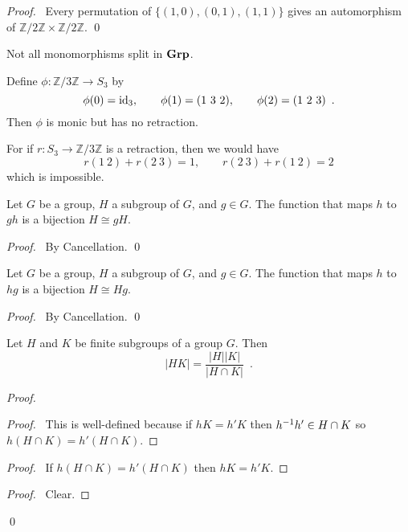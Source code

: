\begin{proof}
    \pf\ Every permutation of $\{ (1,0), (0,1), (1,1) \}$ gives an automorphism of $\mathbb{Z} / 2 \mathbb{Z} \times \mathbb{Z} / 2 \mathbb{Z}$. \qed
\end{proof}

\begin{ex}
Not all monomorphisms split in $\mathbf{Grp}$.

Define $\phi : \mathbb{Z} / 3 \mathbb{Z} \rightarrow S_3$ by
\[ \phi(0) = \id{3}, \qquad \phi(1) = (1 \ 3 \ 2), \qquad \phi(2) = (1 \ 2 \ 3) \enspace . \]
Then $\phi$ is monic but has no retraction.

For if $r : S_3 \rightarrow \mathbb{Z} / 3 \mathbb{Z}$ is a retraction, then we would have
\[ r(1\ 2) + r(2\ 3) = 1, \qquad r(2\ 3) + r(1\ 2) = 2 \]
which is impossible.
\end{ex}

\begin{prop}
Let $G$ be a group, $H$ a subgroup of $G$, and $g \in G$. The function that maps $h$ to $gh$ is a bijection $H \cong gH$.
\end{prop}

\begin{proof}
\pf\ By Cancellation. \qed
\end{proof}

\begin{prop}
Let $G$ be a group, $H$ a subgroup of $G$, and $g \in G$. The function that maps $h$ to $hg$ is a bijection $H \cong Hg$.
\end{prop}

\begin{proof}
\pf\ By Cancellation. \qed
\end{proof}

\begin{prop}
\label{prop:order-of-HK}
Let $H$ and $K$ be finite subgroups of a group $G$. Then
\[ |HK| = \frac{|H||K|}{|H \cap K|} \enspace . \]
\end{prop}

\begin{proof}
\pf
{}
\begin{proof}
	\pf\ This is well-defined because if $hK = h'K$ then ${h}^{-1} h' \in H \cap K$ so $h(H \cap K) = h'(H \cap K)$.
\end{proof}
\begin{proof}
	\pf\ If $h(H \cap K) = h'(H \cap K)$ then $hK = h'K$.
\end{proof}
\begin{proof}
	\pf\ Clear.
\end{proof}
\qed
\end{proof}

